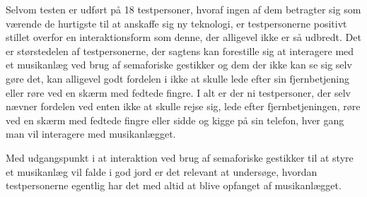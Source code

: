 Selvom testen er udført på 18 testpersoner, hvoraf ingen af dem betragter sig som værende de hurtigste til at anskaffe sig ny teknologi, er testpersonerne positivt stillet overfor en interaktionsform som denne, der alligevel ikke er så udbredt. Det er størstedelen af testpersonerne, der sagtens kan forestille sig at interagere med et musikanlæg ved brug af semaforiske gestikker og dem der ikke kan se sig selv gøre det, kan alligevel godt fordelen i ikke at skulle lede efter sin fjernbetjening eller røre ved en skærm med fedtede fingre. I alt er der ni testpersoner, der selv nævner fordelen ved enten ikke at skulle rejse sig, lede efter fjernbetjeningen, røre ved en skærm med fedtede fingre eller sidde og kigge på sin telefon, hver gang man vil interagere med musikanlægget.

Med udgangspunkt i at interaktion ved brug af semaforiske gestikker til at styre et musikanlæg vil falde i god jord er det relevant at undersøge, hvordan testpersonerne egentlig har det med altid at blive opfanget af musikanlægget.
